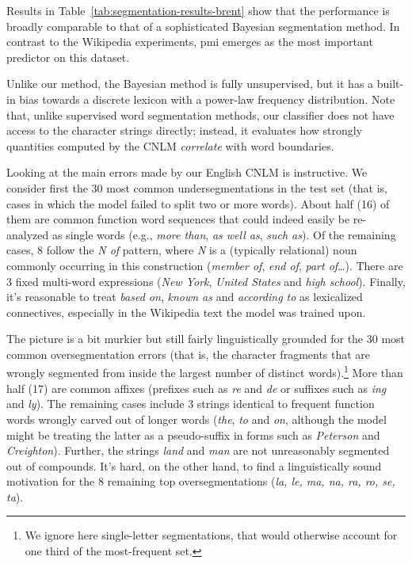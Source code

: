 Results in Table~\ref{tab:segmentation-results-brent} show that the performance is broadly comparable to that of a sophisticated Bayesian segmentation method.
In contrast to the Wikipedia experiments, pmi emerges as the most important predictor on this dataset.

Unlike our method, the Bayesian method is fully unsupervised, but it has a built-in bias towards a discrete lexicon with a power-law frequency distribution.
Note that, unlike supervised word segmentation methods, our classifier does not have access to the character strings directly; instead, it evaluates how strongly quantities computed by the CNLM \emph{correlate} with word boundaries.



Looking at the main errors made by our English CNLM is instructive. We
consider first the 30 most common undersegmentations in the test set
(that is, cases in which the model failed to split two or more
words). About half (16) of them are common function word sequences
that could indeed easily be re-analyzed as single words (e.g.,
\emph{more than}, \emph{as well as}, \emph{such as}). Of the remaining
cases, 8 follow the \emph{N of} pattern, where \emph{N} is a
(typically relational) noun commonly occurring in this construction
(\emph{member of}, \emph{end of}, \emph{part of}\ldots). There are 3
fixed multi-word expressions (\emph{New York}, \emph{United States}
and \emph{high school}). Finally, it's reasonable to treat \emph{based
  on}, \emph{known as} and \emph{according to} as lexicalized
connectives, especially in the Wikipedia text the model was trained
upon.

The picture is a bit murkier but still fairly linguistically grounded
for the 30 most common oversegmentation errors (that is, the character
fragments that are wrongly segmented from inside the largest number of
distinct words).\footnote{We ignore here single-letter segmentations,
  that would otherwise account for one third of the most-frequent
  set.}  More than half (17) are common affixes (prefixes such as
\emph{re} and \emph{de} or suffixes such as \emph{ing} and
\emph{ly}). The remaining cases include 3 strings identical to frequent
function words wrongly carved out of longer words (\emph{the},
\emph{to} and \emph{on}, although the model might be treating the
latter as a pseudo-suffix in forms such as \emph{Peterson} and
\emph{Creighton}). Further, the strings \emph{land} and \emph{man} are not
unreasonably segmented out of compounds. It's hard, on the other hand,
to find a linguistically sound motivation for the 8 remaining top
oversegmentations (\emph{la, le, ma, na, ra, ro, se, ta}).

